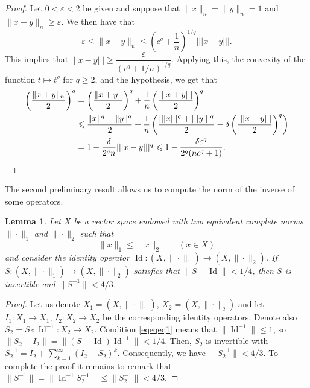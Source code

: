 \documentclass[a4paper,10pt]{amsart}
\theoremstyle{plain}
\newtheorem{lemma}[theorem]{Lemma}
\theoremstyle{definition}
\DeclareMathOperator{\Id}{\mathrm{Id}}
\newcommand{\eps}{\varepsilon}
\renewcommand{\geq}{\geqslant}
\renewcommand{\leq}{\leqslant}
\begin{document}
\begin{proof}
Let $0<\eps<2$ be given and suppose that $\|x\|_n = \|y\|_n =1$ and $\|x-y\|_n \geq \eps$. We then have that
\begin{equation*}
\eps \leq \|x - y\|_n \leq
\left(c^q + \frac 1n\right)^{1/q}|||x - y|||.
\end{equation*}
This implies that $|||x - y||| \geq \dfrac{\eps}{(c^q+1/n)^{1/q}}$. Applying this, the convexity of the function $t\longmapsto t^q$ for $q\geq 2$, and the hypothesis, we get that
\begin{align*}
\left( \frac{\|x + y\|_n}{2} \right)^q &= \left(\frac{\|x+y\|}{2}\right)^q + \frac{1}{n}\left(\frac{||| x + y |||}{2}\right)^q \\
&\leq \frac{\|x\|^q+\|y\|^q}{2} + \frac{1}{n} \left(  \frac{|||x|||^q + |||y|||^q}{2} - \delta \left( \frac{|||x - y|||}{2}\right)^q\right)\\
&= 1- \frac{\delta}{2^qn}|||x-y|||^q \leq 1- \frac{\delta\eps^q}{2^q(nc^q+1)}.\qedhere
\end{align*}
\end{proof}

The second preliminary result allows us to compute the norm of the inverse of some  operators.

\begin{lemma}\label{lemma:norm_of_the_inverse}
Let $X$ be a vector space endowed with two equivalent complete norms $\|\cdot\|_1$ and $\|\cdot\|_2$ such that
\begin{equation} \label{eqeqeq1}
\|x\|_1 \leq  \|x\|_2  \qquad (x\in X)
\end{equation}
and consider the identity operator $\Id:(X,\|\cdot\|_1)\longrightarrow (X,\|\cdot\|_2)$. If $S:(X,\|\cdot\|_1)\longrightarrow (X,\|\cdot\|_2)$ satisfies that $\|S - \Id\|<1/4$, then $S$ is invertible and $\|S^{-1}\|<4/3$.
\end{lemma}

\begin{proof}
Let us denote  $X_1 = (X,\|\cdot\|_1)$,  $X_2 = (X,\|\cdot\|_2)$ and let $I_1: X_1 \longrightarrow X_1$, $I_2: X_2 \longrightarrow X_2$ be the corresponding identity operators. Denote also $S_2 = S \circ \Id^{-1}: X_2 \longrightarrow X_2 $. Condition \eqref{eqeqeq1} means that $\|\Id^{-1}\| \leq 1$,
so $\|S_2 - I_2\|  = \|(S - \Id)\Id^{-1}\| < 1/4$. Then, $S_2$ is invertible with
$S_2^{-1} = I_2 + \sum_{k=1}^\infty(I_2 - S_2)^k$. Consequently, we have $\|S_2^{-1}\| < 4/3$. To complete the proof it remains to remark that  $\|S^{-1}\| = \|\Id^{-1} S_2^{-1} \| \leq \|S_2^{-1}\| <4/3$.
\end{proof}
\end{document}
